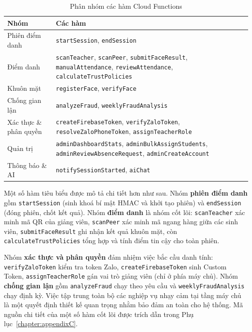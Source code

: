 \documentclass[../main.tex]{subfiles}
\begin{document}
\begin{table}[H]
\centering
\small
\caption{Phân nhóm các hàm Cloud Functions}
\label{tab:functions}
\begin{tabular}{|p{3.2cm}|p{10cm}|}
\hline
\textbf{Nhóm} & \textbf{Các hàm} \\
\hline
Phiên điểm danh & \texttt{startSession}, \texttt{endSession} \\ \hline
Điểm danh & \texttt{scanTeacher}, \texttt{scanPeer}, \texttt{submitFaceResult}, \texttt{manualAttendance}, \texttt{reviewAttendance}, \texttt{calculateTrustPolicies} \\ \hline
Khuôn mặt & \texttt{registerFace}, \texttt{verifyFace} \\ \hline
Chống gian lận & \texttt{analyzeFraud}, \texttt{weeklyFraudAnalysis} \\ \hline
Xác thực \& phân quyền & \texttt{createFirebaseToken}, \texttt{verifyZaloToken}, \texttt{resolveZaloPhoneToken}, \texttt{assignTeacherRole} \\ \hline
Quản trị & \texttt{adminDashboardStats}, \texttt{adminBulkAssignStudents}, \texttt{adminReviewAbsenceRequest}, \texttt{adminCreateAccount} \\ \hline
Thông báo \& AI & \texttt{notifySessionStarted}, \texttt{aiChat} \\ \hline
\end{tabular}
\end{table}

Một số hàm tiêu biểu được mô tả chi tiết hơn như sau. Nhóm \textbf{phiên điểm danh} gồm
\texttt{startSession} (sinh khoá bí mật HMAC và khởi tạo phiên) và \texttt{endSession} (đóng
phiên, chốt kết quả). Nhóm \textbf{điểm danh} là nhóm cốt lõi: \texttt{scanTeacher} xác minh
mã QR của giảng viên, \texttt{scanPeer} xác minh mã ngang hàng giữa các sinh viên,
\texttt{submitFaceResult} ghi nhận kết quả khuôn mặt, còn \texttt{calculateTrustPolicies} tổng
hợp và tính điểm tin cậy cho toàn phiên.

Nhóm \textbf{xác thực và phân quyền} đảm nhiệm việc bắc cầu danh tính: \texttt{verifyZaloToken}
kiểm tra token Zalo, \texttt{createFirebaseToken} sinh Custom Token, \texttt{assignTeacherRole}
gán vai trò giảng viên (chỉ ở phía máy chủ). Nhóm
\textbf{chống gian lận} gồm \texttt{analyzeFraud} chạy theo yêu cầu và
\texttt{weeklyFraudAnalysis} chạy định kỳ. Việc tập trung toàn bộ các nghiệp vụ nhạy cảm tại
tầng máy chủ là một quyết định thiết kế quan trọng nhằm bảo đảm an toàn cho hệ thống. Mã nguồn
chi tiết của một số hàm cốt lõi được trích dẫn trong Phụ lục~\ref{chapter:appendixC}.
\end{document}

